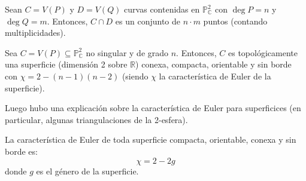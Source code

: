 \documentclass[12pt]{report}
\theoremstyle{largebreak}
\begin{document}
    \begin{theor}
        Sean $C=V(P)$ y $D=V(Q)$ curvas contenidas en $\mathbb{P}^2_{\mathbb{C}}$ con $\deg P=n$ y $\deg Q=m$. Entonces, $C\cap D$ es un conjunto de $n\cdot m$ puntos (contando multiplicidades).
    \end{theor}

    \begin{theor}
        Sea $C=V(P)\subseteq\mathbb{P}^2_{\mathbb{C}}$ no singular y de grado $n$. Entonces, $C$ es topológicamente una superficie (dimensión 2 sobre $\mathbb{R}$) conexa, compacta, orientable y sin borde con $\chi=2-(n-1)(n-2)$ (siendo $\chi$ la característica de Euler de la superficie).
    \end{theor}

    Luego hubo una explicación sobre la característica de Euler para superficices (en particular, algunas triangulaciones de la 2-esfera).

    \begin{theor}
        La característica de Euler de toda superficie compacta, orientable, conexa y sin borde es:
        \begin{equation*}
            \chi=2-2g
        \end{equation*}
        donde $g$ es el género de la superficie.
    \end{theor}
\end{document}
